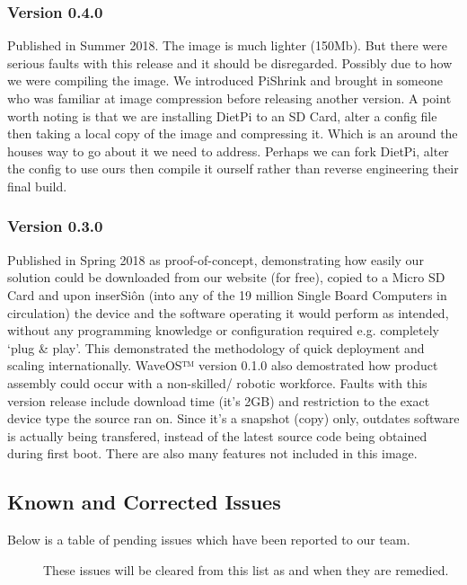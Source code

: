 \documentclass[letterpaper,10pt,openany,oneside,english]{sphinxmanual}
\begin{document}
\subsubsection{Version 0.4.0}
\label{\detokenize{releasenotes:version-0-4-0}}
Published in Summer 2018. The image is much lighter (150Mb). But there were serious faults with this release and it should be disregarded. Possibly due to how we were compiling the image. We introduced PiShrink and brought in someone who was familiar at image compression before releasing another version. A point worth noting is that we are installing DietPi to an SD Card, alter a config file then taking a local copy of the image and compressing it. Which is an around the houses way to go about it we need to address. Perhaps we can fork DietPi, alter the config to use ours then compile it ourself rather than reverse engineering their final build.


\subsubsection{Version 0.3.0}
\label{\detokenize{releasenotes:version-0-3-0}}
Published in Spring 2018 as proof-of-concept, demonstrating how easily our solution could be downloaded from our website (for free), copied to a Micro SD Card and upon inserSiôn (into any of the 19 million Single Board Computers in circulation) the device and the software operating it would perform as intended, without any programming knowledge or configuration required e.g. completely ‘plug \& play’. This demonstrated the methodology of quick deployment and scaling internationally. WaveOS™ version 0.1.0 also demostrated how product assembly could occur with a non-skilled/ robotic workforce. Faults with this version release include download time (it’s 2GB) and restriction to the exact device type the source ran on. Since it’s a snapshot (copy) only, outdates software is actually being transfered, instead of the latest source code being obtained during first boot. There are also many features not included in this image.


\subsection{Known and Corrected Issues}
\label{\detokenize{releasenotes:known-and-corrected-issues}}\begin{description}
\item[{Below is a table of pending issues which have been reported to our team.}] \leavevmode
These issues will be cleared from this list as and when they are remedied.

\end{description}
\end{document}
